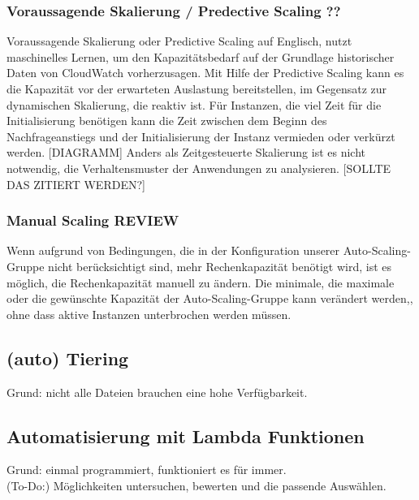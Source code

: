 \subsubsection{Voraussagende Skalierung / Predective Scaling ??}
Voraussagende Skalierung oder Predictive Scaling auf Englisch, nutzt maschinelles Lernen, um den Kapazitätsbedarf auf der Grundlage historischer Daten von CloudWatch vorherzusagen. Mit Hilfe der Predictive Scaling kann es die Kapazität vor der erwarteten Auslastung bereitstellen, im Gegensatz zur dynamischen Skalierung, die reaktiv ist. 
Für Instanzen, die viel Zeit für die Initialisierung benötigen kann die Zeit zwischen dem Beginn des Nachfrageanstiegs und der Initialisierung der Instanz vermieden oder verkürzt werden.
[DIAGRAMM]
Anders als Zeitgesteuerte Skalierung ist es nicht notwendig, die Verhaltensmuster der Anwendungen zu analysieren.
[SOLLTE DAS ZITIERT WERDEN?]

\subsubsection{ Manual Scaling REVIEW}
Wenn aufgrund von Bedingungen, die in der Konfiguration unserer Auto-Scaling-Gruppe nicht berücksichtigt sind, mehr Rechenkapazität benötigt wird, ist es möglich, die Rechenkapazität manuell zu ändern. Die minimale, die maximale oder die gewünschte Kapazität der Auto-Scaling-Gruppe kann verändert werden,, ohne dass aktive Instanzen unterbrochen werden müssen.








\subsection{(auto) Tiering }
Grund: nicht alle Dateien brauchen eine hohe Verfügbarkeit.

\subsection{Automatisierung mit Lambda Funktionen}
Grund: einmal programmiert, funktioniert es für immer.
\\(To-Do:) Möglichkeiten untersuchen, bewerten und die passende Auswählen.


